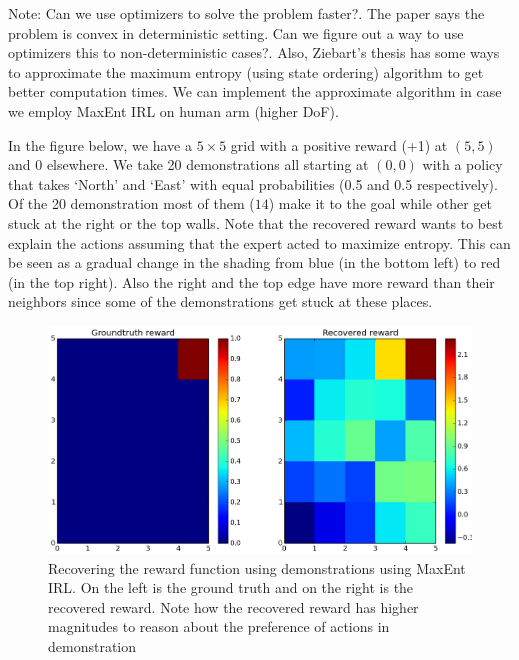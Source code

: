 \documentclass{article}[11pt]
\begin{document}
Note: Can we use optimizers to solve the problem faster?. The paper says the problem is convex in deterministic setting. Can we figure out a way to use optimizers this to non-deterministic cases?. Also, Ziebart's thesis has some ways to approximate the maximum entropy (using state ordering) algorithm to get better computation times. We can implement the approximate algorithm in case we employ MaxEnt IRL on human arm (higher DoF).  

In the figure below, we have a $5\times5$ grid with a positive reward (+1) at $(5,5)$ and 0 elsewhere. We take 20 demonstrations all starting at $(0,0)$ with a policy that takes `North' and `East' with equal probabilities (0.5 and 0.5 respectively). Of the 20 demonstration most of them ($14$) make it to the goal while other get stuck at the right or the top walls. Note that the recovered reward wants to best explain the actions assuming that the expert acted to maximize entropy. This can be seen as a gradual change in the shading from blue (in the bottom left) to red (in the top right). Also the right and the top edge have more reward than their neighbors since some of the demonstrations get stuck at these places. 
 


\begin{figure}[H]
  \begin{center}
    \includegraphics[width=1\linewidth]{images/max_entresults}
    \caption{Recovering the reward function using demonstrations using MaxEnt IRL. On the left is the ground truth and on the right is the recovered reward. Note how the recovered reward has higher magnitudes to reason about the preference of actions in demonstration}
    \label{fig:converge}
  \end{center}
\end{figure}
\end{document}
